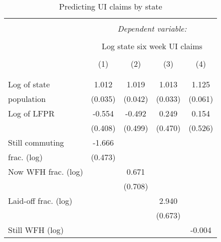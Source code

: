 \begin{table}[!htbp] \centering                    \caption{Predicting UI claims by state}                    \label{tab:ui}                  \small                  \begin{tabular}{@{\extracolsep{5pt}}lcccc}                  \\[-1.8ex]\hline                  \hline \\[-1.8ex]                   & \multicolumn{4}{c}{\textit{Dependent variable:}} \\                  \cline{2-5}                  \\[-1.8ex] & \multicolumn{4}{c}{Log state six week UI claims} \\                  \\[-1.8ex] & (1) & (2) & (3) & (4)\\                  \hline \\[-1.8ex]               
 \\
[1em]
Log of state        &       1.012\sym{***}&       1.019\sym{***}&       1.013\sym{***}&       1.125\sym{***}\\
population          &     (0.035)         &     (0.042)         &     (0.033)         &     (0.061)         \\
[1em]
Log of LFPR         &      -0.554         &      -0.492         &       0.249         &       0.154         \\
                    &     (0.408)         &     (0.499)         &     (0.470)         &     (0.526)         \\
[1em]
Still commuting     &      -1.666\sym{***}&                     &                     &                     \\
frac. (log)         &     (0.473)         &                     &                     &                     \\
[1em]
Now WFH frac. (log) &                     &       0.671         &                     &                     \\
                    &                     &     (0.708)         &                     &                     \\
[1em]
Laid-off frac. (log)&                     &                     &       2.940\sym{***}&                     \\
                    &                     &                     &     (0.673)         &                     \\
[1em]
Still WFH (log)     &                     &                     &                     &      -0.004\sym{**} \\

\end{tabular}
\end{table}
